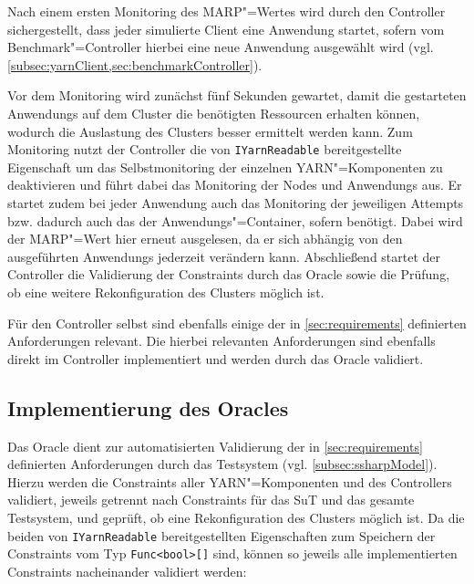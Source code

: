 Nach einem ersten Monitoring des \gls{MARP}"=Wertes wird durch den Controller sichergestellt, dass jeder simulierte Client eine \gls{Anwendung} startet, sofern vom Benchmark"=Controller hierbei eine neue \gls{Anwendung} ausgewählt wird (vgl. \cref{subsec:yarnClient,sec:benchmarkController}).

Vor dem Monitoring wird zunächst fünf Sekunden gewartet, damit die gestarteten \glspl{Anwendung} auf dem Cluster die benötigten Ressourcen erhalten können, wodurch die Auslastung des Clusters besser ermittelt werden kann.
Zum Monitoring nutzt der Controller die von \texttt{IYarnReadable} bereitgestellte Eigenschaft um das Selbstmonitoring der einzelnen \gls{YARN}"=Komponenten zu deaktivieren und führt dabei das Monitoring der Nodes und \glspl{Anwendung} aus.
Er startet zudem bei jeder \gls{Anwendung} auch das Monitoring der jeweiligen \glspl{Attempt} bzw. dadurch auch das der Anwendungs"=Container, sofern benötigt.
Dabei wird der \gls{MARP}"=Wert hier erneut ausgelesen, da er sich abhängig von den ausgeführten \glspl{Anwendung} jederzeit verändern kann.
Abschließend startet der Controller die Validierung der Constraints durch das Oracle sowie die Prüfung, ob eine weitere Rekonfiguration des Clusters möglich ist.

Für den Controller selbst sind ebenfalls einige der in \cref{sec:requirements} definierten Anforderungen relevant.
Die hierbei relevanten Anforderungen sind ebenfalls direkt im Controller implementiert und werden durch das Oracle validiert.

\subsection{Implementierung des Oracles}
\label{subsec:oracleImpl}

Das Oracle dient zur automatisierten Validierung der in \cref{sec:requirements} definierten Anforderungen durch das Testsystem (vgl. \cref{subsec:ssharpModel}).
Hierzu werden die Constraints aller \gls{YARN}"=Komponenten und des Controllers validiert, jeweils getrennt nach Constraints für das \gls{SuT} und das gesamte Testsystem, und geprüft, ob eine Rekonfiguration des Clusters möglich ist.
Da die beiden von \texttt{IYarnReadable} bereitgestellten Eigenschaften zum Speichern der Constraints vom Typ \texttt{Func<bool>[]} sind, können so jeweils alle implementierten Constraints nacheinander validiert werden:

